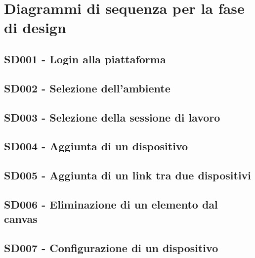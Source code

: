 \documentclass[../main.tex]{subfiles}
\begin{document}
\section{Diagrammi di sequenza per la fase di design}

\subsection{SD001 - Login alla piattaforma }
\figure[H]
\centering

\endfigure
\clearpage
\subsection{SD002 - Selezione dell'ambiente }
\figure[H]
\centering

\endfigure
\clearpage
\subsection{SD003 - Selezione della sessione di lavoro }
\figure[H]
\centering

\endfigure
\clearpage
\subsection{SD004 - Aggiunta di un dispositivo }
\figure[H]
\centering

\endfigure
\clearpage

\subsection{SD005 - Aggiunta di un link tra due dispositivi }
\figure[H]
\centering

\endfigure
\clearpage

\subsection{SD006 - Eliminazione di un elemento dal canvas }
\figure[H]
\centering

\endfigure
\clearpage

\subsection{SD007 - Configurazione di un dispositivo }
\figure[H]
\centering

\endfigure
\clearpage
\end{document}
